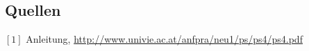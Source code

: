 \documentclass[12pt,a4paper]{article}
\begin{document}
\begin{multicols}{2}
\section{Quellen}
$[1]$ Anleitung, \url{http://www.univie.ac.at/anfpra/neu1/ps/ps4/ps4.pdf}\\
\end{multicols}
\end{document}
